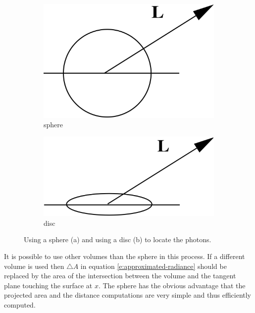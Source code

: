 \begin{figure}
\begin{center}
	\begin{subfigure}[b]{.48\textwidth}
		\includegraphics[width=1.\textwidth]{graphics/pm/pm-7-1}
		\caption{sphere}
	\end{subfigure}
	\begin{subfigure}[b]{.48\textwidth}
		\includegraphics[width=1.\textwidth]{graphics/pm/pm-7-2}
		\caption{disc}
	\end{subfigure}
\end{center}
\caption{Using a sphere (a) and using a disc (b) to locate the photons.}
\label{f:sphere-and-disc}
\end{figure}

It is possible to use other volumes than the sphere in this process. If a different volume is used then $\triangle A$ in equation \ref{e:approximated-radiance} should be replaced by the area of the intersection between the volume and the tangent plane touching the surface at $x$. The sphere has the obvious advantage that the projected area and the distance computations are very simple and thus efficiently computed. 

